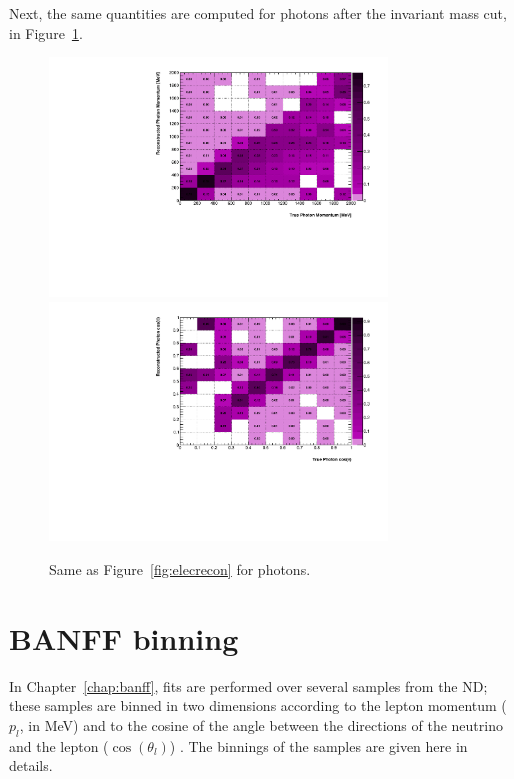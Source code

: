 Next, the same quantities are computed for photons after the invariant
mass cut, in Figure~\ref{fig:photonrecon}.

\begin{figure}[ht]
  \center
  \includegraphics[width=0.8\textwidth]{T2K-TN-254/images/resol/0_MomResolutionGamma.pdf} 
  \includegraphics[width=0.8\textwidth]{T2K-TN-254/images/resol/2_CosResolutionGamma.pdf} 
  \caption[Photon resolutions]{Same as Figure~\ref{fig:elecrecon} for
    photons.}
  \label{fig:photonrecon}
\end{figure}

\clearpage
\newpage
\blankpage

\chapter{BANFF binning}
\label{app:binning}
In Chapter~\ref{chap:banff}, fits are performed over several samples
from the \Gls{ND}; these samples are binned in two dimensions
according to the lepton momentum ($p_l$, in MeV) and to the cosine of
the angle between the directions of the neutrino and the lepton
($\cos(\theta_l)$) . The binnings of the samples are given here in
details.

